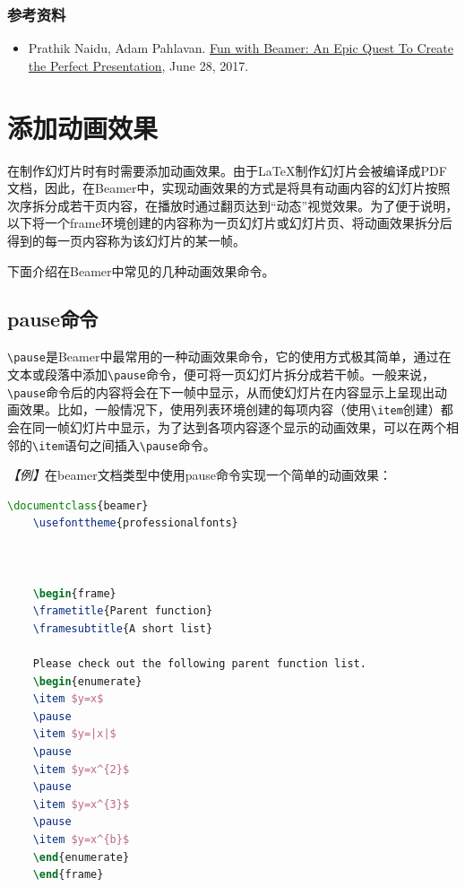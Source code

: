 \subsubsection{参考资料}
\begin{itemize}
    \item Prathik Naidu, Adam Pahlavan.
          \href{http://web.mit.edu/rsi/www/pdfs/beamer-tutorial.pdf}{Fun with
              Beamer: An Epic Quest To Create the Perfect Presentation}, June 28,
          2017.
\end{itemize}

\section{添加动画效果}

在制作幻灯片时有时需要添加动画效果。由于LaTeX制作幻灯片会被编译成PDF文档，因此，在Beamer中，实现动画效果的方式是将具有动画内容的幻灯片按照次序拆分成若干页内容，在播放时通过翻页达到“动态”视觉效果。为了便于说明，以下将一个frame环境创建的内容称为一页幻灯片或幻灯片页、将动画效果拆分后得到的每一页内容称为该幻灯片的某一帧。

下面介绍在Beamer中常见的几种动画效果命令。

\subsection{pause命令}

\texttt{\textbackslash{}pause}是Beamer中最常用的一种动画效果命令，它的使用方式极其简单，通过在文本或段落中添加\texttt{\textbackslash{}pause}命令，便可将一页幻灯片拆分成若干帧。一般来说，\texttt{\textbackslash{}pause}命令后的内容将会在下一帧中显示，从而使幻灯片在内容显示上呈现出动画效果。比如，一般情况下，使用列表环境创建的每项内容（使用\texttt{\textbackslash{}item}创建）都会在同一帧幻灯片中显示，为了达到各项内容逐个显示的动画效果，可以在两个相邻的\texttt{\textbackslash{}item}语句之间插入\texttt{\textbackslash{}pause}命令。

\emph{【例】}在beamer文档类型中使用pause命令实现一个简单的动画效果：
\begin{lstlisting}[language=TeX]
    \documentclass{beamer}
    \usefonttheme{professionalfonts}

    

    \begin{frame}
    \frametitle{Parent function}
    \framesubtitle{A short list}

    Please check out the following parent function list.
    \begin{enumerate}
    \item $y=x$
    \pause
    \item $y=|x|$
    \pause
    \item $y=x^{2}$
    \pause
    \item $y=x^{3}$
    \pause
    \item $y=x^{b}$
    \end{enumerate}
    \end{frame}

    
\end{lstlisting}

